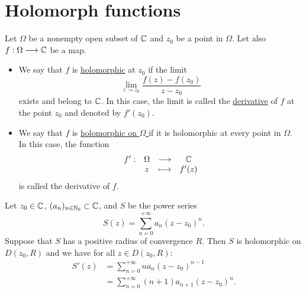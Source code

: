 \section{Holomorph functions}
\begin{definition}[]
Let $\Omega  $ be a nonempty open subset of $\mathbb{C}  $ and $z_0 $ be a point in $\Omega  $. Let also
$ f : \Omega  \longrightarrow \mathbb{C}  $ be a map. 
\begin{itemize}
  \item 
We say that $f $ is \underline{holomorphic} at $z_0 $ 
if the limit
\[
  \lim_{z \to z_0} \frac{f(z)  - f(z_0) }{z-z_0}
\]
exists and belong to $\mathbb{C}$. In this case, the limit is called the \underline{derivative} of $f $ at the point
$z_0 $ and denoted by $f'(z_0)  $. 
\end{itemize}
\begin{itemize}
  \item We say that $f $ is \underline{holomorphic on $\Omega  $ } if it is holomorphic at every point 
    in $\Omega  $. \\ In this case, the function
    \[
    \begin{array}{cccc}
          f' : &  \Omega   & \longrightarrow & \mathbb{C}  \\
    
               &  z  & \longmapsto     & f'(z)  \\ 
    \end{array}
    \]
    is called the derivative of $f$. 
\end{itemize}
\end{definition}
\begin{proposition}
  Let $z_0 \in  \mathbb{C}  $, $(a_n ) _{n \in   \mathbb{N}_0} \subset \mathbb{C} $, and $S $ be the power series
  \[
  S(z)  = \sum_{n=0}^{+\infty} a_n (z-z_0) ^n.
  \]
  Suppose that $S $ has a positive radius of convergence $R $. Then $S $ is holomorphic on 
  $D(z_0, R)  $ and we have for all $z \in  D(z_0, R):$
  \begin{align*}
    S'(z)  &= \sum_{n=0}^{+\infty} n a_n (z-z_0) ^{n-1} \\
           &= \sum_{n=0}^{+\infty} (n+1) a_{n+1} (z-z_0) ^n .
  \end{align*}
\end{proposition}
